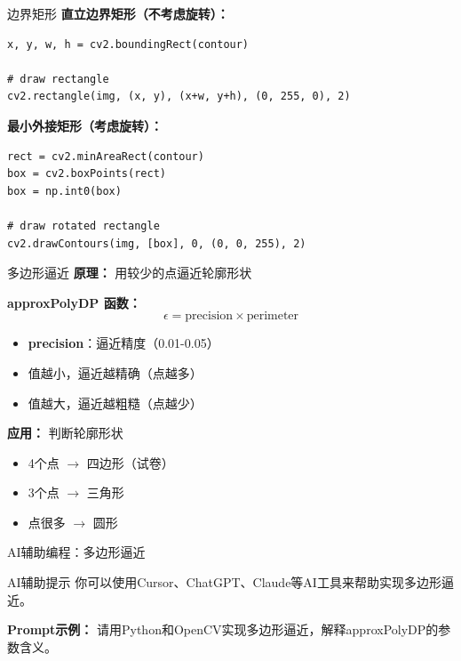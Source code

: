 \begin{frame}[fragile]{边界矩形}
    \textbf{直立边界矩形（不考虑旋转）：}
    \begin{lstlisting}[basicstyle=\ttfamily\scriptsize]
x, y, w, h = cv2.boundingRect(contour)

# draw rectangle
cv2.rectangle(img, (x, y), (x+w, y+h), (0, 255, 0), 2)
    \end{lstlisting}

    \vspace{0.2cm}

    \textbf{最小外接矩形（考虑旋转）：}
    \begin{lstlisting}[basicstyle=\ttfamily\scriptsize]
rect = cv2.minAreaRect(contour)
box = cv2.boxPoints(rect)
box = np.int0(box)

# draw rotated rectangle
cv2.drawContours(img, [box], 0, (0, 0, 255), 2)
    \end{lstlisting}

\end{frame}

\begin{frame}{多边形逼近}
    \textbf{原理：} 用较少的点逼近轮廓形状

    \vspace{0.2cm}

    \textbf{approxPolyDP 函数：}
    $$\epsilon = \text{precision} \times \text{perimeter}$$

    \begin{itemize}
        \item \textbf{precision}：逼近精度（0.01-0.05）
        \item 值越小，逼近越精确（点越多）
        \item 值越大，逼近越粗糙（点越少）
    \end{itemize}

    \vspace{0.3cm}

    \textbf{应用：} 判断轮廓形状
    \begin{itemize}
        \item 4个点 $\rightarrow$ 四边形（试卷）
        \item 3个点 $\rightarrow$ 三角形
        \item 点很多 $\rightarrow$ 圆形
    \end{itemize}
\end{frame}

\begin{frame}{AI辅助编程：多边形逼近}
    \begin{block}{AI辅助提示}
        你可以使用Cursor、ChatGPT、Claude等AI工具来帮助实现多边形逼近。

        \textbf{Prompt示例：} 请用Python和OpenCV实现多边形逼近，解释approxPolyDP的参数含义。
    \end{block}
\end{frame}

